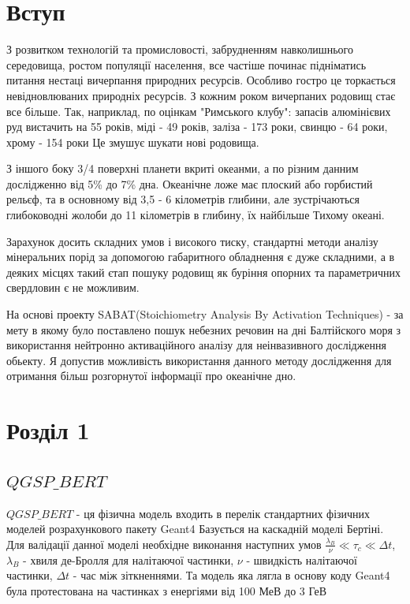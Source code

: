 \documentclass[a4paper, 14pt]{article}
\numberwithin{equation}{section}
\numberwithin{table}{section}
\begin{document}
\newpage
\tableofcontents
\newpage
\pagestyle{plain}
\setcounter{page}{2}
	
\newpage
\section{Вступ}

З розвитком технологій та промисловості, забрудненням навколишнього середовища, ростом популяції населення, все частіше починає підніматись питання нестаці вичерпання природних ресурсів. Особливо гостро це торкається невідновлюваних природніх ресурсів. З кожним роком вичерпаних родовищ стає все більше. Так, наприклад, по оцінкам "Римського клубу": запасів алюмінієвих руд вистачить на 55 років, міді - 49 років, заліза - 173 роки, свинцю - 64 роки, хрому - 154 роки Це змушує шукати нові родовища.

З іншого боку 3/4 поверхні планети вкриті океанми, а по різним данним дослідженно від 5\% до 7\% дна.
Океанічне ложе має плоский або горбистий рельєф, та в основному від 3,5 - 6 кілометрів глибини, але зустрічаються глибоководні жолоби до 11 кілометрів в глибину, їх найбільше Тихому океані. 

Зарахунок досить складних умов і високого тиску, стандартні методи аналізу мінеральних порід за допомогою габаритного обладнення є дуже складними, а в деяких місцях такий єтап пошуку родовищ як буріння опорних та параметричних свердловин є не можливим.

На основі проекту SABAT(Stoichiometry Analysis By Activation Techniques) - за мету в якому було поставлено пошук небезних речовин на дні Балтійского моря з використання нейтронно активаційного аналізу для неінвазивного дослідження обьекту. Я допустив можливість використання данного методу дослідження для отримання більш розгорнутої інформації про океанічне дно.	


\setcounter{figure}{0} 
\newpage
\section{Розділ 1}
\setcounter{figure}{0} 
\subsection{$QGSP\_BERT$}
$QGSP\_BERT$ - ця фізична модель входить в перелік стандартних фізичних моделей розрахункового пакету Geant4
Базується на каскадній моделі Бертіні. Для валідації данної моделі необхідне виконання наступних умов $\frac{\lambda_B}{\nu} \ll \tau_c \ll \Delta{t}$, $\lambda_B$ - хвиля де-Бролля для налітаючої частинки, $\nu$ - швидкість налітаючої частинки, $\Delta{t}$ - час між зіткненнями. Та модель яка лягла в основу коду Geant4 була протестована на частинках з енергіями від 100 МеВ до 3 ГеВ
\end{document}
